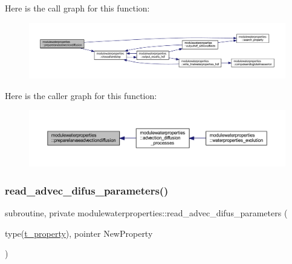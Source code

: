 Here is the call graph for this function\+:\nopagebreak
\begin{figure}[H]
\begin{center}
\leavevmode
\includegraphics[width=350pt]{namespacemodulewaterproperties_ac64c0bef47a698a3d4ee6c542620ff58_cgraph}
\end{center}
\end{figure}
Here is the caller graph for this function\+:\nopagebreak
\begin{figure}[H]
\begin{center}
\leavevmode
\includegraphics[width=350pt]{namespacemodulewaterproperties_ac64c0bef47a698a3d4ee6c542620ff58_icgraph}
\end{center}
\end{figure}
\mbox{\label{namespacemodulewaterproperties_a178c0df0a5c46c1d129d7dfd6e6982fc}} 
\subsubsection{\texorpdfstring{read\+\_\+advec\+\_\+difus\+\_\+parameters()}{read\_advec\_difus\_parameters()}}
{\footnotesize\ttfamily subroutine, private modulewaterproperties\+::read\+\_\+advec\+\_\+difus\+\_\+parameters (\begin{DoxyParamCaption}\item[{type(\mbox{\hyperlink{structmodulewaterproperties_1_1t__property}{t\+\_\+property}}), pointer}]{New\+Property }\end{DoxyParamCaption})\hspace{0.3cm}{\ttfamily [private]}}


